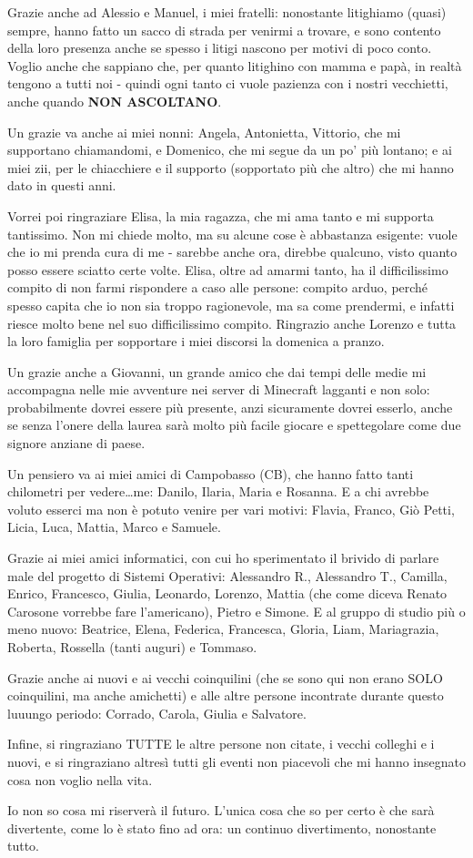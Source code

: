 Grazie anche ad Alessio e Manuel, i miei fratelli: nonostante litighiamo (quasi) sempre, hanno fatto un sacco di strada per venirmi a trovare, e sono contento della loro presenza anche se spesso i litigi nascono per motivi di poco conto.
Voglio anche che sappiano che, per quanto litighino con mamma e papà, in realtà tengono a tutti noi - quindi ogni tanto ci vuole pazienza con i nostri vecchietti, anche quando \textbf{NON ASCOLTANO}.

Un grazie va anche ai miei nonni: Angela, Antonietta, Vittorio, che mi supportano chiamandomi, e Domenico, che mi segue da un po' più lontano; e ai miei zii, per le chiacchiere e il supporto (sopportato più che altro) che mi hanno dato in questi anni.

Vorrei poi ringraziare Elisa, la mia ragazza, che mi ama tanto e mi supporta tantissimo.
Non mi chiede molto, ma su alcune cose è abbastanza esigente: vuole che io mi prenda cura di me - sarebbe anche ora, direbbe qualcuno, visto quanto posso essere sciatto certe volte.
Elisa, oltre ad amarmi tanto, ha il difficilissimo compito di non farmi rispondere a caso alle persone: compito arduo, perché spesso capita che io non sia troppo ragionevole, ma sa come prendermi, e infatti riesce molto bene nel suo difficilissimo compito.
Ringrazio anche Lorenzo e tutta la loro famiglia per sopportare i miei discorsi la domenica a pranzo.

Un grazie anche a Giovanni, un grande amico che dai tempi delle medie mi accompagna nelle mie avventure nei server di Minecraft lagganti e non solo: probabilmente dovrei essere più presente, anzi sicuramente dovrei esserlo, anche se senza l'onere della laurea sarà molto più facile giocare e spettegolare come due signore anziane di paese.

Un pensiero va ai miei amici di Campobasso (CB), che hanno fatto tanti chilometri per vedere\ldots me: Danilo, Ilaria, Maria e Rosanna.
E a chi avrebbe voluto esserci ma non è potuto venire per vari motivi: Flavia, Franco, Giò Petti, Licia, Luca, Mattia, Marco e Samuele.

Grazie ai miei amici informatici, con cui ho sperimentato il brivido di parlare male del progetto di Sistemi Operativi: Alessandro R., Alessandro T., Camilla, Enrico, Francesco, Giulia, Leonardo, Lorenzo, Mattia (che come diceva Renato Carosone vorrebbe fare l'americano), Pietro e Simone.
E al gruppo di studio più o meno nuovo: Beatrice, Elena, Federica, Francesca, Gloria, Liam, Mariagrazia, Roberta, Rossella (tanti auguri) e Tommaso.

Grazie anche ai nuovi e ai vecchi coinquilini (che se sono qui non erano SOLO coinquilini, ma anche amichetti) e alle altre persone incontrate durante questo luuungo periodo: Corrado, Carola, Giulia e Salvatore.

Infine, si ringraziano TUTTE le altre persone non citate, i vecchi colleghi e i nuovi, e si ringraziano altresì tutti gli eventi non piacevoli che mi hanno insegnato cosa non voglio nella vita.

Io non so cosa mi riserverà il futuro.
L'unica cosa che so per certo è che sarà divertente, come lo è stato fino ad ora: un continuo divertimento, nonostante tutto.